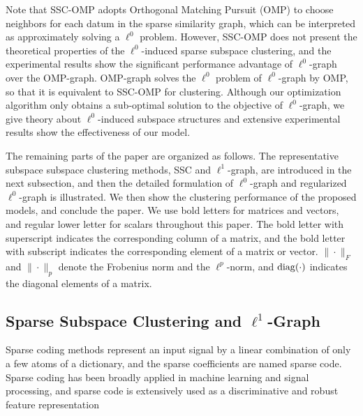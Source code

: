 \documentclass[10pt,twocolumn,letterpaper]{article}
\begin{document}
Note that SSC-OMP \cite{Dyer13a} adopts Orthogonal Matching Pursuit (OMP) \cite{Tropp04} to choose neighbors for each datum in the sparse similarity graph, which can be interpreted as approximately solving a $\ell^{0}$ problem. However, SSC-OMP does not present the theoretical properties of the $\ell^{0}$-induced sparse subspace clustering, and the experimental results show the significant performance advantage of $\ell^{0}$-graph over the OMP-graph. OMP-graph solves the $\ell^{0}$ problem of $\ell^{0}$-graph by OMP, so that it is equivalent to SSC-OMP for clustering. Although our optimization algorithm only obtains a sub-optimal solution to the objective of $\ell^{0}$-graph, we give theory about $\ell^{0}$-induced subspace structures and extensive experimental results show the effectiveness of our model.

The remaining parts of the paper are organized as follows. The representative subspace subspace clustering methods, SSC and $\ell^{1}$-graph, are introduced in the next subsection, and then the detailed formulation of $\ell^{0}$-graph and regularized $\ell^{0}$-graph is illustrated. We then show the clustering performance of the proposed models, and conclude the paper. We use bold letters for matrices and vectors, and regular lower letter for scalars throughout this paper. The bold letter with superscript indicates the corresponding column of a matrix, and the bold letter with subscript indicates the corresponding element of a matrix or vector. $\|\cdot\|_F$ and $\|\cdot\|_p$ denote the Frobenius norm and the $\ell^{p}$-norm, and ${\rm diag}(\cdot)$ indicates the diagonal elements of a matrix.

\subsection{Sparse Subspace Clustering and $\ell^{1}$-Graph}
Sparse coding methods represent an input signal by a linear combination of only a few atoms of a dictionary, and the sparse coefficients are named sparse code. Sparse coding has been broadly applied in machine learning and signal processing, and sparse code is extensively used as a discriminative and robust feature representation \cite{YangYGH09,ChengSRL2013,ZhangGLXA13,YYZRl1graphBMVC2014}
\end{document}
